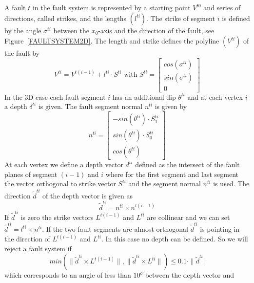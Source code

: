 A fault $t$ in the fault system is represented by a starting point $V^{t0}$
and series of directions, called strikes, and the lengths $(l^{ti})$.
The strike of segment $i$ is defined by the angle $\sigma^{ti}$ between the
$x_{0}$-axis and the direction of the fault, see Figure~\ref{FAULTSYSTEM2D}.
The length and strike defines the polyline $(V^{ti})$ of the fault by
\begin{equation}
V^{ti} = V^{t(i-1)} + 
l^{ti} \cdot  S^{ti}
\mbox{ with }
S^{ti} =
\left[
\begin{array}{c}
 cos(\sigma^{ti})  \\
 sin(\sigma^{ti}) \\
 0 
\end{array}
\right]
\label{eq:fault 00}
\end{equation}
In the 3D case each fault segment $i$ has an additional dip
$\theta^{ti}$ and at each vertex $i$ a depth $\delta^{ti}$ is given.
The fault segment normal $n^{ti}$ is given by
\begin{equation}
n^{ti} = 
\left[
\begin{array}{c}
 -sin(\theta^{ti}) \cdot S^{ti}_{1} \\
 sin(\theta^{ti}) \cdot S^{ti}_{0} \\
 cos(\theta^{ti}) 
\end{array}
\right]
\label{eq:fault 0}
\end{equation}
At each vertex we define a depth vector $d^{ti}$ defined as the intersect of
the fault planes of segment $(i-1)$ and $i$ where for the first segment and
last segment the vector orthogonal to strike vector $S^{ti}$
and the segment normal $n^{ti}$ is used. The direction $\tilde{d}^{ti}$ of the
depth vector is given as
\begin{equation}
\tilde{d}^{ti} = n^{ti} \times n^{t(i-1)}
\label{eq:fault b}
\end{equation}
If $\tilde{d}^{ti}$ is zero the strike vectors $L^{t(i-1)}$ and $L^{ti}$ are
collinear and we can set $\tilde{d}^{ti} = l^{ti} \times n^{ti}$.
If the two fault segments are almost orthogonal $\tilde{d}^{ti}$ is pointing
in the direction of $L^{t(i-1)}$ and $L^{ti}$. In this case no depth can be
defined. So we will reject a fault system if
\begin{equation}
min(\| \tilde{d}^{ti}  \times  L^{t(i-1)} \|,\| \tilde{d}^{ti}  \times  L^{ti} \|) 
\le 0.1 \cdot \| \tilde{d}^{ti} | 
\label{eq:fault c}
\end{equation}
which corresponds to an angle of less than $10^o$ between the depth vector and

